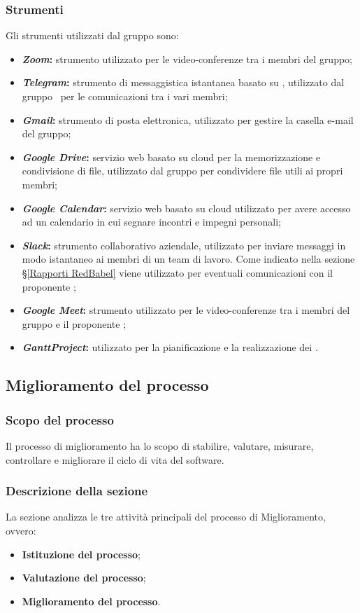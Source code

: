 \subsubsection{Strumenti}
Gli strumenti utilizzati dal gruppo sono:
\begin{itemize}
	\item \textbf{\textit{Zoom}:} strumento utilizzato per le video-conferenze tra i membri del gruppo;
	\item \textbf{\textit{Telegram}:} strumento di messaggistica istantanea basato su , utilizzato dal gruppo \Gruppo\ per le comunicazioni tra i vari membri;
	\item \textbf{\textit{Gmail}:} strumento  di posta elettronica, utilizzato per gestire la casella e-mail del gruppo;
	\item \textbf{\textit{Google Drive}:} servizio web basato su cloud per la memorizzazione e condivisione di file, utilizzato dal gruppo per condividere file utili ai propri membri;
	\item \textbf{\textit{Google Calendar}:} servizio web basato su cloud utilizzato per avere accesso ad un calendario in cui segnare incontri e impegni personali;
	\item \textbf{\textit{Slack}:} strumento collaborativo aziendale, utilizzato per inviare messaggi in modo istantaneo ai membri di un team di lavoro. Come indicato nella sezione \S\ref{Rapporti RedBabel} viene utilizzato per eventuali comunicazioni con il proponente \Proponente;
	\item \textbf{\textit{Google Meet}:} strumento utilizzato per le video-conferenze tra i membri del gruppo e il proponente \Proponente;
	\item \textbf{\textit{GanttProject}:} utilizzato per la pianificazione e la realizzazione dei .
\end{itemize}

\subsection{Miglioramento del processo}
\subsubsection{Scopo del processo}
Il processo di miglioramento ha lo scopo di stabilire, valutare, misurare, controllare e migliorare il ciclo di vita del software.
\subsubsection{Descrizione della sezione}
La sezione analizza le tre attività principali del processo di Miglioramento, ovvero:
\begin{itemize}
	\item \textbf{Istituzione del processo};	
	\item \textbf{Valutazione del processo};
	\item \textbf{Miglioramento del processo}.
\end{itemize}

